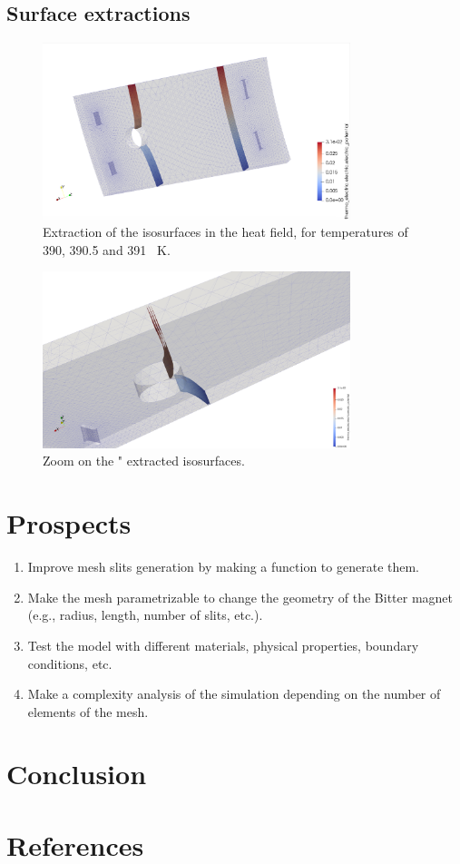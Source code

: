 \documentclass[12pt]{article}
\begin{document}
\subsection{Surface extractions}

\begin{figure}[H]
  \centering
  \includegraphics[width=0.8\textwidth]{images/isosurfaces.png}
  \caption{Extraction of the isosurfaces in the heat field, for temperatures of
  390, 390.5 and 391 \SI{}{\kelvin}.}
\end{figure}

\begin{figure}[H]
  \centering
  \includegraphics[width=0.8\textwidth]{images/isosurfaces_zoom.png}
  \caption{Zoom on the " extracted isosurfaces.}
\end{figure}

\section{Prospects}
\begin{enumerate}
  \item Improve mesh slits generation by making a function to generate them.
  \item Make the mesh parametrizable to change the geometry of the Bitter magnet
    (e.g., radius, length, number of slits, etc.).
  \item Test the model with different materials, physical properties, boundary conditions, etc.
  \item Make a complexity analysis of the simulation depending on the number of elements of the mesh.
\end{enumerate}

\section{Conclusion}

\newpage

\section{References}
\printbibliography
\end{document}
